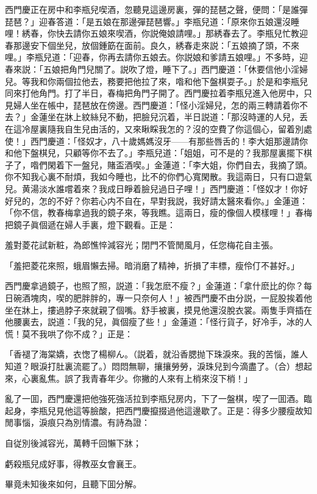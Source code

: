 西門慶正在房中和李瓶兒喫酒，忽聽見這邊房裏，彈的琵琶之聲，便問：「是誰彈琵琶？」迎春答道：「是五娘在那邊彈琵琶響。」李瓶兒道：「原來你五娘還沒睡哩！綉春，你快去請你五娘來喫酒，你説俺娘請哩。」那綉春去了。李瓶兒忙教迎春那邊安下個坐兒，放個鍾筯在面前。良久，綉春走來説：「五娘摘了頭，不來哩。」李瓶兒道：「迎春，你再去請你五娘去。你説娘和爹請五娘哩。」不多時，迎春來説：「五娘把角門兒關了。説吹了燈，睡下了。」西門慶道：「休要信他小淫婦兒。等我和你兩個拉他去，務要把他拉了來，喒和他下盤棋耍子。」於是和李瓶兒同來打他角門。打了半日，春梅把角門子開了。西門慶拉着李瓶兒進入他房中，只見婦人坐在帳中，琵琶放在傍邊。西門慶道：「怪小淫婦兒，怎的兩三轉請着你不去？」金蓮坐在牀上紋絲兒不動，把臉兒沉着，半日説道：「那沒時運的人兒，丢在這冷屋裏隨我自生兒由活的，又來瞅睬我怎的？沒的空費了你這個心，留着別處使！」西門慶道：「怪奴才，八十歲媽媽沒牙——有那些唇舌的！李大姐那邊請你和他下盤棋兒，只顧等你不去了。」李瓶兒道：「姐姐，可不是的？我那屋裏擺下棋子了，喒們閑着下一盤兒，賭盃酒喫。」金蓮道：「李大姐，你們自去，我摘了頭。你不知我心裏不耐煩，我如今睡也，比不的你們心寬閑散。我這兩日，只有口遊氣兒。黄湯淡水誰嚐着來？我成日睜着臉兒過日子哩！」西門慶道：「怪奴才！你好好兒的，怎的不好？你若心内不自在，早對我説，我好請太醫來看你。」金蓮道：「你不信，教春梅拿過我的鏡子來，等我瞧。這兩日，瘦的像個人模樣哩！」春梅把鏡子眞個遞在婦人手裏，燈下觀看。正是：

\begin{myquote}
羞對菱花試新粧，為郎憔悴減容光；閉門不管閒風月，任您梅花自主張。

「羞把菱花來照，蛾眉懶去掃。暗消磨了精神，折損了丰標，瘦伶仃不甚好。」
\end{myquote}

西門慶拿過鏡子，也照了照，説道：「我怎麽不瘦？」金蓮道：「拿什麽比的你？每日碗酒塊肉，喫的肥胖胖的，專一只奈何人！」被西門慶不由分説，一屁股挨着他坐在牀上，摟過脖子來就親了個嘴。舒手被裏，摸見他還沒脫衣裳。兩隻手齊插在他腰裏去，説道：「我的兒，眞個瘦了些！」金蓮道：「怪行貨子，好冷手，冰的人慌！莫不我哄了你不成？」正是：

\begin{myquote}
「香褪了海棠嬌，衣愡了楊柳ん。{\marktext\small\color{mydarkgray}（説着，就沿香腮抛下珠淚來。我的苦惱，誰人知道？眼淚打肚裏流罷了。）}悶悶無聊，攘攘勞勞，淚珠兒到今滴盡了。{\marktext\small（合）}想起來，心裏亂焦。誤了我青春年少。你撇的人來有上梢來沒下梢！」
\end{myquote}

亂了一囬，西門慶還把他強死強活拉到李瓶兒房内，下了一盤棋，喫了一囬酒。臨起身，李瓶兒見他這等臉酸，把西門慶攛掇過他這邊歇了。正是：得多少腰瘦故知閒事惱，淚痕只為別情濃。有詩為證：

\begin{myquote}
自従別後減容光，萬轉千回懶下牀；

虧殺瓶兒成好事，得教巫女會襄王。
\end{myquote}

畢竟未知後來如何，且聽下囬分解。

